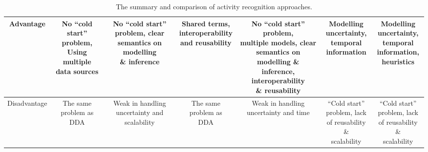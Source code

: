 \begin{sidewaystable}[htbp]
\begin{center}
\begin{tabular}{ccccccc}
	    \hline
	    Advantage & \specialcell{No ``cold start''\\problem,\\Using multiple\\data sources} & \specialcell{No ``cold start''\\problem, clear\\semantics on modelling\\\& inference} & \specialcell{Shared terms,\\interoperability\\and reusability} & \specialcell{No ``cold start'' problem,\\multiple models, clear\\semantics on modelling \&\\inference, interoperability\\\& reusability}  & \specialcell{Modelling\\uncertainty,\\temporal\\information} & \specialcell{Modelling\\uncertainty,\\temporal\\information,\\heuristics} \\
	    \hline
	    Disadvantage & \specialcell{The same\\problem as\\DDA} & \specialcell{Weak in handling\\uncertainty and\\scalability}  & \specialcell{The same\\problem as\\DDA} & \specialcell{Weak in handling\\uncertainty and time} & \specialcell{``Cold start''\\problem, lack\\of reusability \&\\scalability} & \specialcell{``Cold start''\\problem, lack\\of reusability \&\\scalability} \\
            \hline
        \end{tabular}
        \caption{The summary and comparison of activity recognition approaches.}
        \label{tab:soa:comparison}
    \end{center}
\end{sidewaystable}